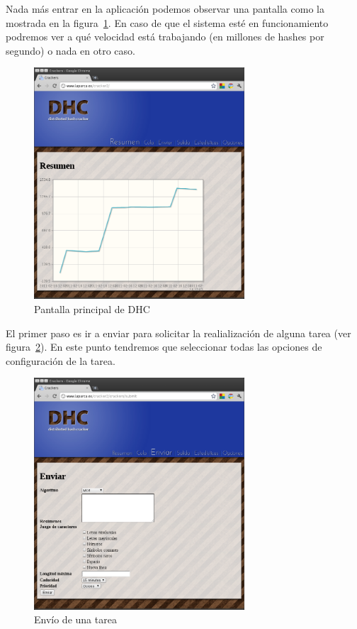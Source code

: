 Nada más entrar en la aplicación podemos observar una pantalla como la mostrada en la figura~\ref{fig:DHC_principal}. En caso de que el sistema esté en funcionamiento podremos ver a qué velocidad está trabajando (en millones de hashes por segundo) o nada en otro caso.

\begin{figure}
	\centering
	\includegraphics[width=0.7\textwidth]{images/resumen.png}
	\caption{Pantalla principal de DHC}\label{fig:DHC_principal}
\end{figure}

El primer paso es ir a enviar para solicitar la realialización de alguna tarea (ver figura~\ref{fig:DHC_enviar}). En este punto tendremos que seleccionar todas las opciones de configuración de la tarea.

\begin{figure}
	\centering
	\includegraphics[width=0.7\textwidth]{images/dhc_enviar.png}
	\caption{Envío de una tarea}\label{fig:DHC_enviar}
\end{figure}

